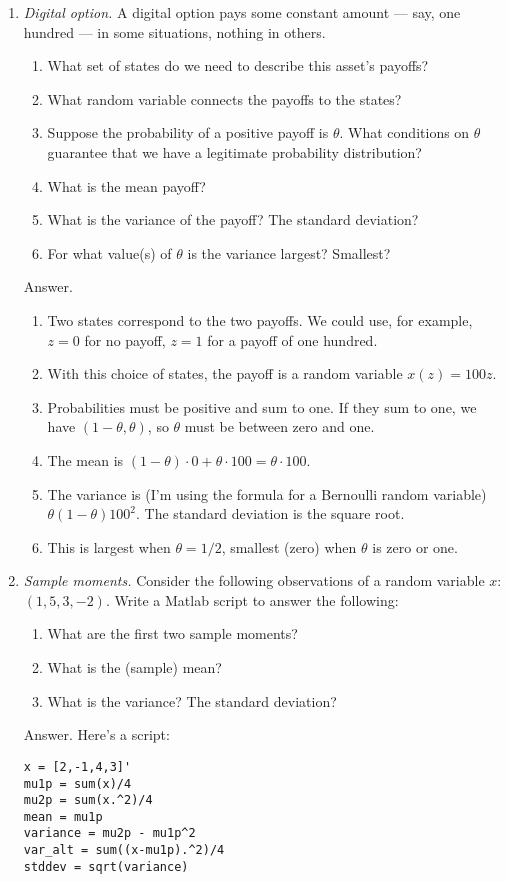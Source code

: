 \begin{enumerate}
\item {\it Digital option.\/}
A digital option pays some constant amount --- say, one hundred ---
in some situations, nothing in others.
\begin{enumerate}
\item What set of states do we need to describe this asset's payoffs?
\item What random variable connects the payoffs to the states?
\item Suppose the probability of a positive payoff is $\theta$.
What conditions on $\theta$ guarantee that we have a legitimate probability distribution?
\item What is the mean payoff?
\item What is the variance of the payoff?
The standard deviation?
\item For what value(s) of $\theta$ is the variance largest?  Smallest?
\end{enumerate}
%
Answer.
\begin{enumerate}
\item Two states correspond to the two payoffs.  We could use, for example,
$z=0$ for no payoff, $z=1$ for a payoff of one hundred.
\item With this choice of states, the payoff is a random variable $x(z) = 100 z$.
\item Probabilities must be positive and sum to one.
If they sum to one, we have $(1-\theta, \theta)$,
so $\theta$ must be between zero and one.
\item The mean is $ (1-\theta) \cdot 0 + \theta \cdot 100 = \theta \cdot 100 $.
\item The variance is (I'm using the formula for a Bernoulli random variable)
$ \theta (1-\theta) 100^2$.
The standard deviation is the square root.
\item This is largest when $\theta = 1/2$, smallest (zero) when $\theta$ is zero or one.
\end{enumerate}

\item {\it Sample moments.\/}
Consider the following observations of a random variable $x$:
 $ (1,5,3,-2)$.
 Write a Matlab script to answer the following:
\begin{enumerate}
\item What are the first two sample moments?
\item What is the (sample) mean?
\item What is the variance?  The standard deviation?
\end{enumerate}
%
Answer.
Here's a script:
\begin{verbatim}
x = [2,-1,4,3]'
mu1p = sum(x)/4
mu2p = sum(x.^2)/4
mean = mu1p
variance = mu2p - mu1p^2
var_alt = sum((x-mu1p).^2)/4
stddev = sqrt(variance)
\end{verbatim}


\end{enumerate}
